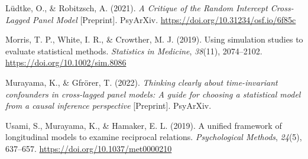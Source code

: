 \documentclass[
]{interact}
\newlength{\cslhangindent}
\newlength{\cslentryspacingunit} %
\newenvironment{CSLReferences}[2] %
 {%
  \setlength{\parindent}{0pt}
  \ifodd #1
  \let\oldpar\par
  \def\par{\hangindent=\cslhangindent\oldpar}
  \fi
  \setlength{\parskip}{#2\cslentryspacingunit}
 }%
 {}
\begin{document}
\hypertarget{refs}{}
\begin{CSLReferences}{1}{0}
\leavevmode{}%
Lüdtke, O., \& Robitzsch, A. (2021). \emph{A {Critique} of the {Random
Intercept Cross-Lagged Panel Model}} {[}Preprint{]}. {PsyArXiv}.
\url{https://doi.org/10.31234/osf.io/6f85c}

\leavevmode{}%
Morris, T. P., White, I. R., \& Crowther, M. J. (2019). Using simulation
studies to evaluate statistical methods. \emph{Statistics in Medicine},
\emph{38}(11), 2074--2102. \url{https://doi.org/10.1002/sim.8086}

\leavevmode{}%
Murayama, K., \& Gfrörer, T. (2022). \emph{Thinking clearly about
time-invariant confounders in cross-lagged panel models: {A} guide for
choosing a statistical model from a causal inference perspective}
{[}Preprint{]}. {PsyArXiv}.

\leavevmode{}%
Usami, S., Murayama, K., \& Hamaker, E. L. (2019). A unified framework
of longitudinal models to examine reciprocal relations.
\emph{Psychological Methods}, \emph{24}(5), 637--657.
\url{https://doi.org/10.1037/met0000210}

\end{CSLReferences}
\end{document}
